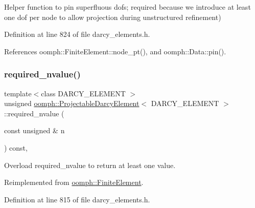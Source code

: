 Helper function to pin superfluous dofs; required because we introduce at least one dof per node to allow projection during unstructured refinement) 



Definition at line 824 of file darcy\+\_\+elements.\+h.



References oomph\+::\+Finite\+Element\+::node\+\_\+pt(), and oomph\+::\+Data\+::pin().

\mbox{\label{classoomph_1_1ProjectableDarcyElement_ae250fc064c8c4d34f4e58191c6742df5}} 
\subsubsection{\texorpdfstring{required\+\_\+nvalue()}{required\_nvalue()}}
{\footnotesize\ttfamily template$<$class D\+A\+R\+C\+Y\+\_\+\+E\+L\+E\+M\+E\+NT $>$ \\
unsigned \hyperlink{classoomph_1_1ProjectableDarcyElement}{oomph\+::\+Projectable\+Darcy\+Element}$<$ D\+A\+R\+C\+Y\+\_\+\+E\+L\+E\+M\+E\+NT $>$\+::required\+\_\+nvalue (\begin{DoxyParamCaption}\item[{const unsigned \&}]{n }\end{DoxyParamCaption}) const\hspace{0.3cm}{\ttfamily [inline]}, {\ttfamily [virtual]}}



Overload required\+\_\+nvalue to return at least one value. 



Reimplemented from \hyperlink{classoomph_1_1FiniteElement_a56610c60d5bc2d7c27407a1455471b1a}{oomph\+::\+Finite\+Element}.



Definition at line 815 of file darcy\+\_\+elements.\+h.

\mbox{\label{classoomph_1_1ProjectableDarcyElement_abfbe95045be80a5aacaa0f3a714468fe}} 
